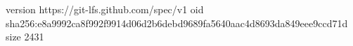version https://git-lfs.github.com/spec/v1
oid sha256:e8a9992ca8f992f9914d06d2b6debd9689fa5640aac4d8693da849eee9ccd71d
size 2431
